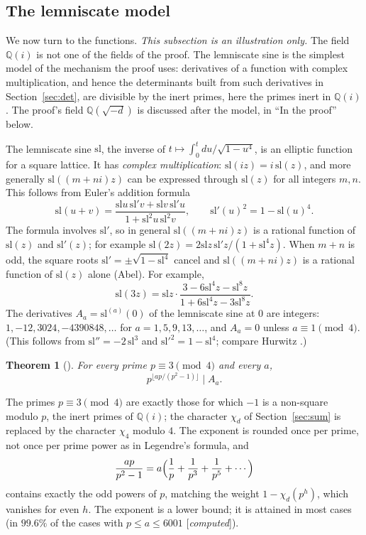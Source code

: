 \documentclass[11pt]{amsart}
\numberwithin{equation}{section}
\newtheorem{theorem}{Theorem}[section]
\theoremstyle{definition}
\theoremstyle{remark}
\newcommand{\Q}{\mathbb Q}
\renewcommand{\sl}{\mathrm{sl}}
\newcommand{\status}[1]{\textup{[\emph{#1}]}}
\begin{document}
\subsection*{The lemniscate model}
We now turn to the functions.
\emph{This subsection is an illustration only.} The field $\Q(i)$ is not one of the fields of the proof. The lemniscate sine is the simplest model of the mechanism the proof uses: derivatives of a function with complex multiplication, and hence the determinants built from such derivatives in Section~\ref{sec:det}, are divisible by the inert primes, here the primes inert in $\Q(i)$. The proof's field $\Q(\sqrt{-d})$ is discussed after the model, in ``In the proof'' below.

The lemniscate sine $\sl$, the inverse of $t\mapsto\int_0^tdu/\sqrt{1-u^4}$, is an elliptic function for a square lattice. It has \emph{complex multiplication}: $\sl(iz)=i\,\sl(z)$, and more generally $\sl((m+ni)z)$ can be expressed through $\sl(z)$ for all integers $m,n$. This follows from Euler's addition formula
\begin{equation}
 \sl(u+v)=\frac{\sl u\,\sl'v+\sl v\,\sl'u}{1+\sl^2u\,\sl^2v},\qquad \sl'(u)^2=1-\sl(u)^4 .
\end{equation}
The formula involves $\sl'$, so in general $\sl((m+ni)z)$ is a rational function of $\sl(z)$ and $\sl'(z)$; for example $\sl(2z)=2\sl z\,\sl'z/(1+\sl^4z)$. When $m+n$ is odd, the square roots $\sl'=\pm\sqrt{1-\sl^4}$ cancel and $\sl((m+ni)z)$ is a rational function of $\sl(z)$ alone (Abel). For example,
\begin{equation}\label{eq:sl3}
 \sl(3z)=\sl z\cdot\frac{3-6\sl^4z-\sl^8z}{1+6\sl^4z-3\sl^8z}.
\end{equation}
 The derivatives $A_a=\sl^{(a)}(0)$ of the lemniscate sine at $0$ are integers: $1,-12,3024,-4390848,\dots$ for $a=1,5,9,13,\dots$, and $A_a=0$ unless $a\equiv1\pmod4$. (This follows from $\sl''=-2\,\sl^3$ and $\sl'^2=1-\sl^4$; compare Hurwitz \cite{hurwitz}.)

\begin{theorem}[\cite{earlier}]
For every prime $p\equiv3\pmod4$ and every $a$,
\begin{equation}
 p^{\lfloor ap/(p^2-1)\rfloor}\mid A_a.
\end{equation}

\end{theorem}

The primes $p\equiv3\pmod4$ are exactly those for which $-1$ is a non-square modulo $p$, the inert primes of $\Q(i)$; the character $\chi_d$ of Section~\ref{sec:sum} is replaced by the character $\chi_4$ modulo $4$. The exponent is rounded once per prime, not once per prime power as in Legendre's formula, and
\begin{equation}
 \frac{ap}{p^2-1}=a\Bigl(\frac1p+\frac1{p^3}+\frac1{p^5}+\cdots\Bigr)
\end{equation}
contains exactly the odd powers of $p$, matching the weight $1-\chi_d(p^h)$, which vanishes for even $h$. The exponent is a lower bound; it is attained in most cases (in $99.6\%$ of the cases with $p\le a\le6001$ \status{computed}).
\end{document}
